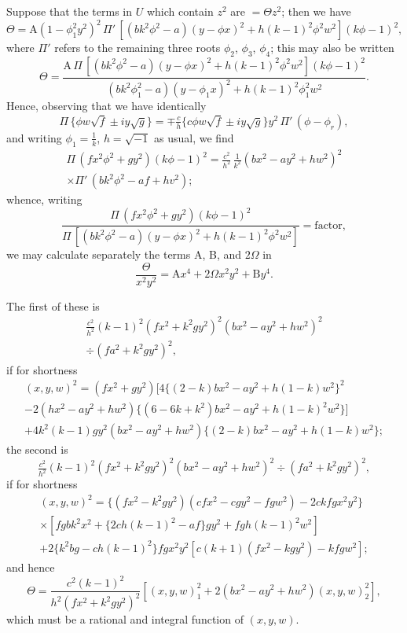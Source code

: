 \documentclass[11pt,a4paper]{book}
\begin{document}
Suppose that the terms in $U$ which contain $z^{2}$ are $= \Theta z^{2}$; then we have
\[
\Theta = \text{A}(1 - \phi_{1}^{2}y^{2})^{2}\,\Pi'\,[(bk^{2}\phi^{2} - a)(y - \phi x)^{2} + h(k-1)^{2}\phi^{2}w^{2}](k\phi - 1)^{2},
\]
where $\Pi'$ refers to the remaining three roots $\phi_{2}$, $\phi_{3}$, $\phi_{4}$; this may also be written
\[
\Theta = \frac{\text{A}\,\Pi\,[(bk^{2}\phi^{2} - a)(y - \phi x)^{2} + h(k-1)^{2}\phi^{2}w^{2}](k\phi - 1)^{2}}{(bk^{2}\phi_{1}^{2} - a)(y - \phi_{1}x)^{2} + h(k-1)^{2}\phi_{1}^{2}w^{2}}.
\]
Hence, observing that we have identically
\[
\Pi\,\{\phi w\sqrt{f} \pm iy\sqrt{g}\} = \mp\tfrac{c}{h}\{c\phi w\sqrt{f} \pm iy\sqrt{g}\}y^{2}\,\Pi'\,(\phi - \phi_{r}),
\]
and writing $\phi_{1} = \tfrac{1}{k}$, $h = \sqrt{-1}$ as usual, we find
%
\begin{multline}
\Pi\,(fx^{2}\phi^{2} + gy^{2})(k\phi - 1)^{2} = \tfrac{c^{2}}{h^{2}}\,\tfrac{1}{k^{2}}(bx^{2} - ay^{2} + hw^{2})^{2} \\
\times \Pi'\,(bk^{2}\phi^{2} - af + hv^{2});
\end{multline}
%
whence, writing
\[
\frac{\Pi\,(fx^{2}\phi^{2} + gy^{2})(k\phi - 1)^{2}}{\Pi\,[(bk^{2}\phi^{2} - a)(y - \phi x)^{2} + h(k-1)^{2}\phi^{2}w^{2}]} = \text{factor},
\]
we may calculate separately the terms A, B, and $2\Omega$ in
\[
\frac{\Theta}{x^{2}y^{2}} = \text{A}x^{4} + 2\Omega x^{2}y^{2} + \text{B}y^{4}.
\]

\newpage
\setcounter{page}{107}

The first of these is
%
\begin{multline}
\tfrac{c^{2}}{h^{2}}(k-1)^{2}(fx^{2} + k^{2}gy^{2})^{2}(bx^{2} - ay^{2} + hw^{2})^{2} \\
\div (fa^{2} + k^{2}gy^{2})^{2},
\end{multline}
%
if for shortness
%
\begin{multline}
(x, y, w)^{2} = (fx^{2} + gy^{2})[4\{(2-k)bx^{2} - ay^{2} + h(1-k)w^{2}\}^{2} \\
- 2(hx^{2} - ay^{2} + hw^{2})\{(6 - 6k + k^{2})bx^{2} - ay^{2} + h(1-k)^{2}w^{2}\}] \\
+ 4k^{2}(k-1)gy^{2}(bx^{2} - ay^{2} + hw^{2})\{(2-k)bx^{2} - ay^{2} + h(1-k)w^{2}\};
\end{multline}
%
the second is
\[
\tfrac{c^{2}}{h^{2}}(k-1)^{2}(fx^{2} + k^{2}gy^{2})^{2}(bx^{2} - ay^{2} + hw^{2})^{2} \div (fa^{2} + k^{2}gy^{2})^{2},
\]
if for shortness
%
\begin{multline}
(x, y, w)^{2} = \{(fx^{2} - k^{2}gy^{2})(cfx^{2} - cgy^{2} - fgw^{2}) - 2ckfgx^{2}y^{2}\} \\
\times [fgbk^{2}x^{2} + \{2ch(k-1)^{2} - af\}gy^{2} + fgh(k-1)^{2}w^{2}] \\
+ 2\{k^{2}bg - ch(k-1)^{2}\}fgx^{2}y^{2}[c(k+1)(fx^{2} - kgy^{2}) - kfgw^{2}];
\end{multline}
%
and hence
\[
\Theta = \frac{c^{2}(k-1)^{2}}{h^{2}(fx^{2} + k^{2}gy^{2})^{2}}[(x, y, w)_{1}^{2} + 2(bx^{2} - ay^{2} + hw^{2})(x, y, w)_{2}^{2}],
\]
which must be a rational and integral function of $(x, y, w)$.
\end{document}
